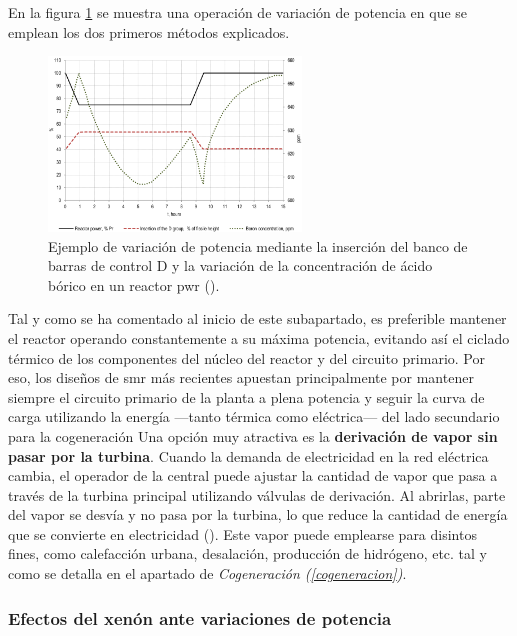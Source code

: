 En la figura \ref{fig:seguimiento_carga_barras_y_boro} se muestra una operación de variación de potencia en que se emplean los dos primeros métodos explicados.

\begin{figure}[h]
  \centering
  \includegraphics[width=0.6\textwidth]{content/figures/seguimiento_carga_barras_y_boro.png}
  \caption{Ejemplo de variación de potencia mediante la inserción del banco de barras de control D y la variación de la concentración de ácido bórico en un reactor \acrshort{pwr} (\cite{NEA_2011_load_following}).}
  \label{fig:seguimiento_carga_barras_y_boro}
\end{figure}

Tal y como se ha comentado al inicio de este subapartado, es preferible mantener el reactor operando constantemente a su máxima potencia, evitando así el ciclado térmico de los componentes del núcleo del reactor y del circuito primario. Por eso, los diseños de \acrshort{smr} más recientes apuestan principalmente por mantener siempre el circuito primario de la planta a plena potencia y seguir la curva de carga utilizando la energía ---tanto térmica como eléctrica--- del lado secundario para la cogeneración Una opción muy atractiva es la \textbf{derivación de vapor sin pasar por la turbina}. Cuando la demanda de electricidad en la red eléctrica cambia, el operador de la central puede ajustar la cantidad de vapor que pasa a través de la turbina principal utilizando válvulas de derivación. Al abrirlas, parte del vapor se desvía y no pasa por la turbina, lo que reduce la cantidad de energía que se convierte en electricidad (\cite{ANS_2019}). Este vapor puede emplearse para disintos fines, como calefacción urbana, desalación, producción de hidrógeno, etc. tal y como se detalla en el apartado de \textit{Cogeneración (\ref{cogeneracion})}. 

\subsubsection{Efectos del xenón ante variaciones de potencia}

